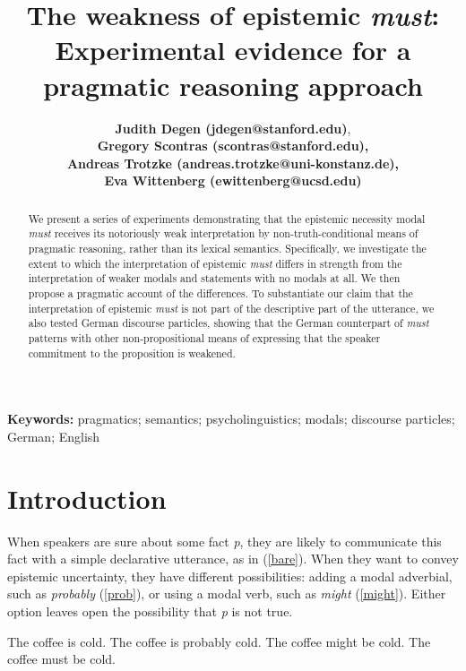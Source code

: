 \documentclass[11pt]{article}
\title{The weakness of epistemic \emph{must}: Experimental evidence for a pragmatic reasoning approach}
\author{{\large \bf Judith Degen (jdegen@stanford.edu)}, \\ {\large \bf Gregory Scontras (scontras@stanford.edu),}\\ {\large \bf Andreas Trotzke (andreas.trotzke@uni-konstanz.de),}\\ {\large \bf Eva Wittenberg (ewittenberg@ucsd.edu)}}
\begin{document}
\maketitle

\begin{abstract}

We present a series of experiments demonstrating that the epistemic necessity modal \emph{must} receives its notoriously weak interpretation by non-truth-conditional means of pragmatic reasoning, rather than its lexical semantics. Specifically, we investigate the extent to which the interpretation of epistemic \emph{must} differs in strength from the interpretation of weaker modals and statements with no modals at all. We then propose a pragmatic account of the differences. To substantiate our claim that the interpretation of epistemic \emph{must} is not part of the descriptive part of the utterance, we also tested German discourse particles, showing that the German counterpart of \emph{must} patterns with other non-propositional means of expressing that the speaker commitment to the proposition is weakened.	
\end{abstract}

\textbf{Keywords:} 
pragmatics; semantics; psycholinguistics; modals; discourse particles; German; English


\section{Introduction}

When speakers are sure about some fact \emph{p}, they are likely to communicate this fact with a simple declarative utterance, as in (\ref{bare}). When they want to convey epistemic uncertainty, they have different possibilities: adding a modal adverbial, such as \emph{probably} (\ref{prob}), or using a modal verb, such as \emph{might} (\ref{might}). Either option leaves open the possibility that \emph{p} is not true.

\begin{exe}
	\ex\label{english} \begin{xlist}
		\ex\label{bare} The coffee is cold.
		\ex\label{prob} The coffee is probably cold.
		\ex\label{might} The coffee might be cold.
		\ex\label{must} The coffee must be cold.
	\end{xlist}
\end{exe}
\end{document}
